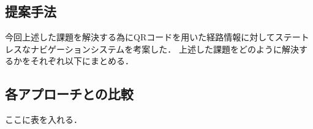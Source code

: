 \subsection{提案手法}
今回上述した課題を解決する為にQRコードを用いた経路情報に対してステートレスなナビゲーションシステムを考案した．
上述した課題をどのように解決するかをそれぞれ以下にまとめる．


\subsection{各アプローチとの比較}
ここに表を入れる．
